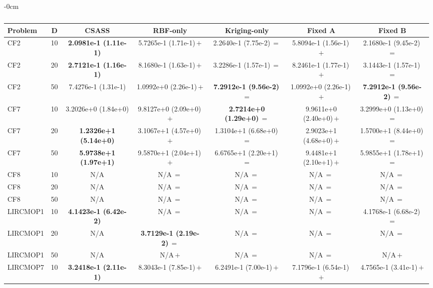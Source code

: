 \begin{table}[!htbp]
\begin{ROneBlock}
\begin{adjustwidth}{-\extralength}{0cm}
\centering
\scriptsize
\setlength{\tabcolsep}{3pt}
\renewcommand{\arraystretch}{1.2}
\caption{}\label{tab:ablation-igd}
\begin{tabular*}{\linewidth}{@{\extracolsep{\fill}}lcccccc@{}}
\toprule
\textbf{Problem} & \textbf{D} & \textbf{CSASS} & \textbf{RBF-only} & \textbf{Kriging-only} & \textbf{Fixed A} & \textbf{Fixed B} \\
\midrule
CF2 & 10 & \textbf{2.0981e-1 (1.11e-1)} & 5.7265e-1 (1.71e-1)\,$+$ & 2.2640e-1 (7.75e-2)\,$=$ & 5.8094e-1 (1.56e-1)\,$+$ & 2.1680e-1 (9.45e-2)\,$=$ \\
CF2 & 20 & \textbf{2.7121e-1 (1.16e-1)} & 8.1680e-1 (1.63e-1)\,$+$ & 3.2286e-1 (1.57e-1)\,$=$ & 8.2461e-1 (1.77e-1)\,$+$ & 3.1443e-1 (1.57e-1)\,$=$ \\
CF2 & 50 & 7.4276e-1 (1.31e-1) & 1.0992e+0 (2.26e-1)\,$+$ & \textbf{7.2912e-1 (9.56e-2)}\,$=$ & 1.0992e+0 (2.26e-1)\,$+$ & \textbf{7.2912e-1 (9.56e-2)}\,$=$ \\
CF7 & 10 & 3.2026e+0 (1.84e+0) & 9.8127e+0 (2.09e+0)\,$+$ & \textbf{2.7214e+0 (1.29e+0)}\,$=$ & 9.9611e+0 (2.40e+0)\,$+$ & 3.2999e+0 (1.13e+0)\,$=$ \\
CF7 & 20 & \textbf{1.2326e+1 (5.14e+0)} & 3.1067e+1 (4.57e+0)\,$+$ & 1.3104e+1 (6.68e+0)\,$=$ & 2.9023e+1 (4.68e+0)\,$+$ & 1.5700e+1 (8.44e+0)\,$=$ \\
CF7 & 50 & \textbf{5.9738e+1 (1.97e+1)} & 9.5870e+1 (2.04e+1)\,$+$ & 6.6765e+1 (2.20e+1)\,$=$ & 9.4481e+1 (2.10e+1)\,$+$ & 5.9855e+1 (1.78e+1)\,$=$ \\
CF8 & 10 & N/A & N/A\,$=$ & N/A\,$=$ & N/A\,$=$ & N/A\,$=$ \\
CF8 & 20 & N/A & N/A\,$=$ & N/A\,$=$ & N/A\,$=$ & N/A\,$=$ \\
CF8 & 50 & N/A & N/A\,$=$ & N/A\,$=$ & N/A\,$=$ & N/A\,$=$ \\
LIRCMOP1 & 10 & \textbf{4.1423e-1 (6.42e-2)} & N/A\,$=$ & N/A\,$=$ & N/A\,$=$ & 4.1768e-1 (6.68e-2)\,$=$ \\
LIRCMOP1 & 20 & N/A & \textbf{3.7129e-1 (2.19e-2)}\,$=$ & N/A\,$=$ & N/A\,$=$ & N/A\,$=$ \\
LIRCMOP1 & 50 & N/A & N/A\,$+$ & N/A\,$=$ & N/A\,$=$ & N/A\,$+$ \\
LIRCMOP7 & 10 & \textbf{3.2418e-1 (2.11e-1)} & 8.3043e-1 (7.85e-1)\,$+$ & 6.2491e-1 (7.00e-1)\,$+$ & 7.1796e-1 (6.54e-1)\,$+$ & 4.7565e-1 (3.41e-1)\,$+$ \\

\end{tabular*}
\end{adjustwidth}
\end{ROneBlock}
\end{table}
